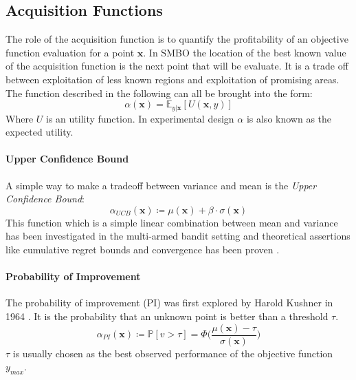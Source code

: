 \documentclass[english]{article}
\newcommand{\x}{\mathbf{x}}
\newcommand{\E}{\mathbb{E}}
\begin{document}
\subsection{Acquisition Functions}
\label{aquifuncs}
The role of the acquisition function is to quantify the profitability of an objective function evaluation for a point $\x$. In SMBO the location of the best known value of the acquisition function is the next point that will be evaluate. It is a trade off between exploitation of less known regions and exploitation of promising areas. The function described in the following can all be brought into the form:
\begin{equation}
  \alpha(\x) = \E_{y|\x}[U(\x,y)]
\end{equation}
Where $U$ is an utility function. In experimental design $\alpha$ is also known as the expected utility.

\paragraph{Upper Confidence Bound}
A simple way to make a tradeoff between variance and mean is the \textit{Upper Confidence Bound}:
\begin{equation}
  \alpha_{UCB}(\x) \coloneqq \mu(\x) + \beta \cdot \sigma(\x)
\end{equation}
This function which is a simple linear combination between mean and variance has been investigated in the multi-armed bandit setting and theoretical assertions like cumulative regret bounds and convergence has been proven \cite{srinivas_gaussian_2009}.

\paragraph{Probability of Improvement}
The probability of improvement (PI) was first explored by Harold Kushner in 1964 \cite{kushner_new_1964}. It is the probability that an unknown point is better than a threshold $\tau$.
\begin{equation}
  \alpha_{PI}(\x) \coloneqq \mathbb{P}[v>\tau] = \Phi\bigg(\frac{\mu(\x)-\tau}{\sigma(\x)}\bigg)
\end{equation}
$\tau$ is usually chosen as the best observed performance of the objective function $y_{max}$.
\end{document}

